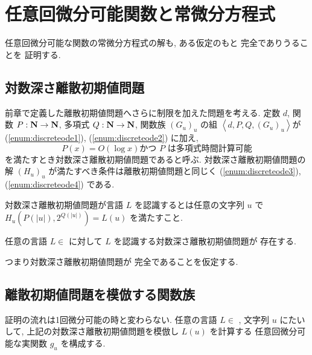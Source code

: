 \section{任意回微分可能関数と常微分方程式}

 任意回微分可能な関数の常微分方程式の解も, ある仮定のもと \PSPACE 完全でありうることを
 証明する.

  \subsection{対数深さ離散初期値問題}
  前章で定義した離散初期値問題へさらに制限を加えた問題を考える.
  定数 $d$, 関数 $P : \mathbf N \to \mathbf N$, 多項式 $Q : \mathbf N \to \mathbf N$, 
  関数族 $(G_u)_u$ の組 $\left< d, P, Q, (G_u)_u \right>$が
  (\ref{enum:discreteode1}), (\ref{enum:discreteode2}) に加え,
  \begin{equation}
   P(x) = O(\log x) \text{かつ $P$ は多項式時間計算可能}
  \end{equation}
  を満たすとき対数深さ離散初期値問題であると呼ぶ.
  対数深さ離散初期値問題の解 $(H_u)_u$ が満たすべき条件は離散初期値問題と同じく
  (\ref{enum:discreteode3}), (\ref{enum:discreteode4}) である.

  対数深さ離散初期値問題が言語 $L$ を認識するとは任意の文字列 $u$ で
  $H_u(P(|u|), 2^{Q(|u|)}) = L(u)$ を満たすこと.

 \begin{hypothesis}
  \label{Hypothesis}
  任意の言語 $L \in$ \PSPACE に対して $L$ を認識する対数深さ離散初期値問題が
  存在する.
 \end{hypothesis}

 つまり対数深さ離散初期値問題が \PSPACE 完全であることを仮定する. 

 \subsection{離散初期値問題を模倣する関数族}

 証明の流れは1回微分可能の時と変わらない.
 任意の言語 $L \in $ \PSPACE, 文字列 $u$ にたいして,
 上記の対数深さ離散初期値問題を模倣し $L(u)$ を計算する
 任意回微分可能な実関数 $g_u$ を構成する.

